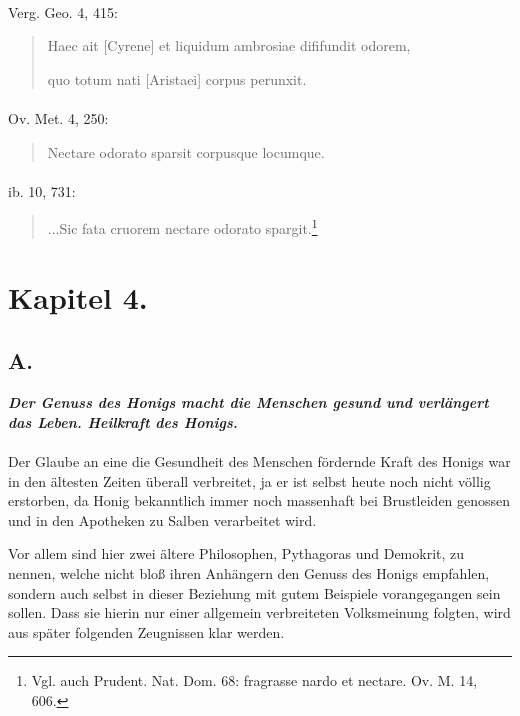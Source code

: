 \documentclass[a4paper, 11pt, oneside]{article}
\begin{document}
\paragraph{}
Verg. Geo. 4, 415:
\begin{quotation}
Haec ait [Cyrene] et liquidum ambrosiae dififundit odorem,

quo totum nati [Aristaei] corpus perunxit.
\end{quotation}
\paragraph{}
Ov. Met. 4, 250:
\begin{quotation}
Nectare odorato sparsit corpusque locumque.
\end{quotation}
\paragraph{}
ib. 10, 731:
\begin{quotation}
...Sic fata cruorem nectare odorato spargit.\footnote{Vgl. auch Prudent. Nat. Dom. 68: fragrasse nardo et nectare. Ov. M. 14, 606.}
\end{quotation}
\paragraph{}
\clearpage
\section{Kapitel 4.}
\subsection{A.}
\begin{center}
\textbf{\emph{Der Genuss des Honigs macht die Menschen gesund und verlängert das Leben. Heilkraft des Honigs.}}
\end{center}
\paragraph{}
Der Glaube an eine die Gesundheit des Menschen fördernde Kraft des Honigs war in den ältesten Zeiten überall verbreitet, ja er ist selbst heute noch nicht völlig erstorben, da Honig bekanntlich immer noch massenhaft bei Brustleiden genossen und in den Apotheken zu Salben verarbeitet wird.

Vor allem sind hier zwei ältere Philosophen, Pythagoras und Demokrit, zu nennen, welche nicht bloß ihren Anhängern den Genuss des Honigs empfahlen, sondern auch selbst in dieser Beziehung mit gutem Beispiele vorangegangen sein sollen. Dass sie hierin nur einer allgemein verbreiteten Volksmeinung folgten, wird aus später folgenden Zeugnissen klar werden.
\end{document}
